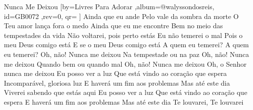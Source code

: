 \beginsong
{Nunca Me Deixou %
}[by={Livres Para Adorar %
},album={@walyssondosreis},
id={GB0072 %
},rev={0}, %
qr={ %
}]
\beginverse*
Ainda que eu ande
Pelo vale da sombra da morte
O Teu amor lança fora o medo
Ainda que eu me encontre
Bem no meio das tempestades da vida
Não voltarei, pois perto estás
\endverse
\beginverse*
Eu não temerei o mal
Pois o meu Deus comigo está
E se o meu Deus comigo está
A quem eu temerei? A quem eu temerei?
\endverse
\beginchorus
Oh, não! Nunca me deixou
Na tempestade ou na paz
Oh, não! Nunca me deixou
Quando bem ou quando mal
Oh, não! Nunca me deixou
Oh, o Senhor nunca me deixou
\endchorus
\beginverse*
Eu posso ver a luz
Que está vindo ao coração que espera
Incomparável, gloriosa luz
E haverá um fim aos problemas
Mas até este dia
Viverei sabendo que estás aqui
\endverse
\beginverse*
Eu posso ver a luz
Que está vindo ao coração que espera
E haverá um fim aos problemas
Mas até este dia
Te louvarei, Te louvarei
\endverse

